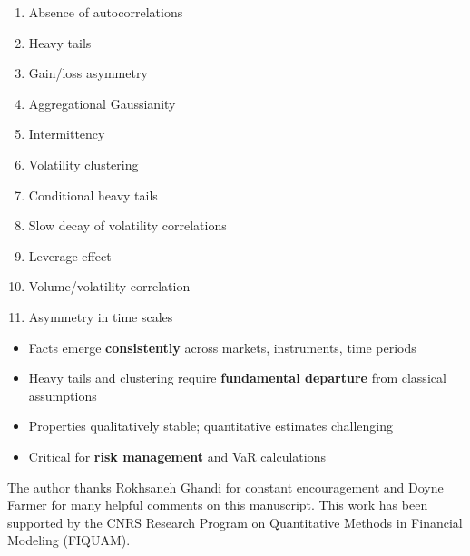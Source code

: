 \documentclass[final]{beamer}
\begin{document}
\begin{frame}[t]
\begin{columns}[t]
\begin{column}{.48\linewidth}
\begin{tcolorbox}[mybox, title=The 11 Stylized Facts]
\large
\begin{enumerate}
\item Absence of autocorrelations
\item Heavy tails %
\item Gain/loss asymmetry
\item Aggregational Gaussianity
\item Intermittency
\item Volatility clustering
\item Conditional heavy tails
\item Slow decay of volatility correlations
\item Leverage effect
\item Volume/volatility correlation
\item Asymmetry in time scales
\end{enumerate}

\end{tcolorbox}

\vspace{0.5cm}

\begin{tcolorbox}[mybox, title=Results \& Conclusions]
\large
\begin{itemize}
\item Facts emerge \textbf{consistently} across markets, instruments, time periods
\item Heavy tails and clustering require \textbf{fundamental departure} from classical assumptions
\item Properties qualitatively stable; quantitative estimates challenging
\item Critical for \textbf{risk management} and VaR calculations
\end{itemize}
\end{tcolorbox}


\vspace{0.5cm}

\begin{tcolorbox}[mybox, title=Acknowledgments]
\large
The author thanks Rokhsaneh Ghandi for constant encouragement and Doyne Farmer for many helpful comments on this
manuscript. This work has been supported by the CNRS Research Program on Quantitative Methods in Financial Modeling (FIQUAM).


\end{tcolorbox}
\end{column}
\end{columns}
\end{frame}
\end{document}
